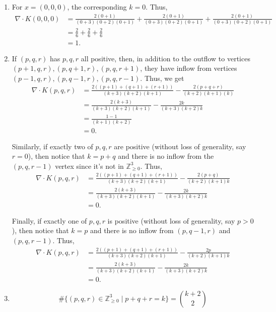\documentclass[12 pt, letterpaper]{hmcpset}
\begin{document}
\begin{solution}
	\begin{enumerate}
		\item For $x = (0, 0, 0)$, the corresponding $k = 0$. Thus,
			 \begin{align*}
				 \nabla \cdot K(0, 0, 0) & = \frac{2 (0 + 1)}{(0 + 3)(0 + 2)(0 + 1)} + \frac{2 (0 + 1)}{(0 + 3)(0 + 2)(0 + 1)} + \frac{2 (0 + 1)}{(0 + 3)(0 + 2)(0 + 1)} \\
							 & = \frac{2}{6} + \frac{2}{6} + \frac{2}{6} \\
							 & = 1.
			\end{align*}

		\item If $(p, q, r)$ has $p, q, r$ all positive, then, in addition to the outflow to vertices $(p + 1, q, r), (p, q + 1, r), (p, q, r + 1)$, they have inflow from vertices $(p - 1, q, r), (p, q - 1, r), (p, q, r - 1)$. Thus, we get
			\begin{align*}
				\nabla \cdot K(p, q, r) & = \frac{2((p + 1) + (q + 1) + (r + 1))}{(k + 3)(k + 2)(k + 1)} - \frac{2(p + q + r)}{(k + 2) (k + 1) (k)} \\
							& = \frac{2(k + 3)}{(k + 3)(k + 2)(k + 1)} - \frac{2k}{(k + 3)(k + 2)k} \\
							& = \frac{1 - 1}{(k + 1)(k + 2)} \\
							& = 0.
			\end{align*}

			Similarly, if exactly two of $p, q, r$ are positive (without loss of generality, say $r = 0$), then notice that $k = p + q$ and there is no inflow from the $(p, q, r - 1)$ vertex since it's not in $\mathbb{Z}^{3}_{\ge 0}$. Thus,
			\begin{align*}
				\nabla \cdot K(p, q, r) & = \frac{2((p + 1) + (q + 1) + (r + 1))}{(k + 3)(k + 2)(k + 1)} - \frac{2(p + q)}{(k + 2) (k + 1) k} \\
							& = \frac{2(k + 3)}{(k + 3)(k + 2)(k + 1)} - \frac{2k}{(k + 3)(k + 2)k} \\
							& = 0.
			\end{align*}

			Finally, if exactly one of $p, q, r$ is positive (without loss of generality, say $p > 0$), then notice that $k = p$ and there is no inflow from $(p, q - 1, r)$ and $(p, q, r - 1)$. Thus,
			\begin{align*}
				\nabla \cdot K(p, q, r) & = \frac{2((p + 1) + (q + 1) + (r + 1))}{(k + 3)(k + 2)(k + 1)} - \frac{2 p}{(k + 2) (k + 1) k} \\
							& = \frac{2(k + 3)}{(k + 3)(k + 2)(k + 1)} - \frac{2k}{(k + 3)(k + 2)k} \\
							& = 0.
			\end{align*}
		\item 
			\[
				\boxed{
					\# \{ (p , q, r) \in \mathbb{Z}^{3}_{\ge 0} \mid p + q + r = k \} = \binom{k + 2}{2}
				}
			\]


\end{enumerate}
\end{solution}
\end{document}
